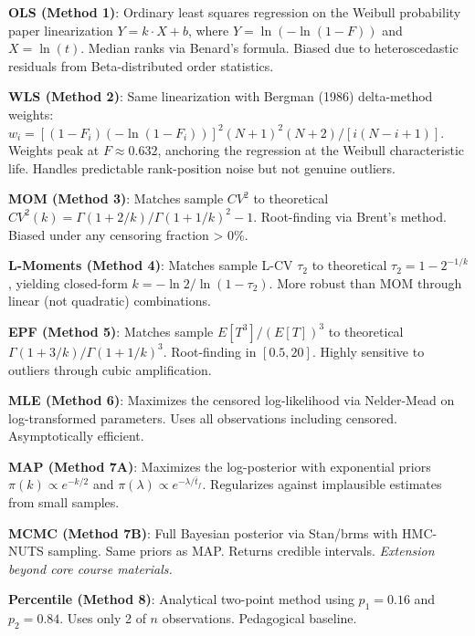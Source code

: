 \documentclass[
]{article}
\begin{document}
\textbf{OLS (Method 1)}: Ordinary least squares regression on the
Weibull probability paper linearization \(Y = k \cdot X + b\), where
\(Y = \ln(-\ln(1-F))\) and \(X = \ln(t)\). Median ranks via Benard's
formula. Biased due to heteroscedastic residuals from Beta-distributed
order statistics.

\textbf{WLS (Method 2)}: Same linearization with Bergman (1986)
delta-method weights:
\(w_i = [(1-F_i)(-\ln(1-F_i))]^2(N+1)^2(N+2)/[i(N-i+1)]\). Weights peak
at \(F \approx 0.632\), anchoring the regression at the Weibull
characteristic life. Handles predictable rank-position noise but not
genuine outliers.

\textbf{MOM (Method 3)}: Matches sample \(CV^2\) to theoretical
\(CV^2(k) = \Gamma(1+2/k)/\Gamma(1+1/k)^2 - 1\). Root-finding via
Brent's method. Biased under any censoring fraction \textgreater{} 0\%.

\textbf{L-Moments (Method 4)}: Matches sample L-CV \(\tau_2\) to
theoretical \(\tau_2 = 1 - 2^{-1/k}\), yielding closed-form
\(k = -\ln 2/\ln(1-\tau_2)\). More robust than MOM through linear (not
quadratic) combinations.

\textbf{EPF (Method 5)}: Matches sample \(E[T^3]/(E[T])^3\) to
theoretical \(\Gamma(1+3/k)/\Gamma(1+1/k)^3\). Root-finding in
\([0.5, 20]\). Highly sensitive to outliers through cubic amplification.

\textbf{MLE (Method 6)}: Maximizes the censored log-likelihood via
Nelder-Mead on log-transformed parameters. Uses all observations
including censored. Asymptotically efficient.

\textbf{MAP (Method 7A)}: Maximizes the log-posterior with exponential
priors \(\pi(k) \propto e^{-k/2}\) and
\(\pi(\lambda) \propto e^{-\lambda/\bar{t}_f}\). Regularizes against
implausible estimates from small samples.

\textbf{MCMC (Method 7B)}: Full Bayesian posterior via Stan/brms with
HMC-NUTS sampling. Same priors as MAP. Returns credible intervals.
\emph{Extension beyond core course materials.}

\textbf{Percentile (Method 8)}: Analytical two-point method using
\(p_1 = 0.16\) and \(p_2 = 0.84\). Uses only 2 of \(n\) observations.
Pedagogical baseline.

\begingroup\fontsize{8}{10}\selectfont
\end{document}
